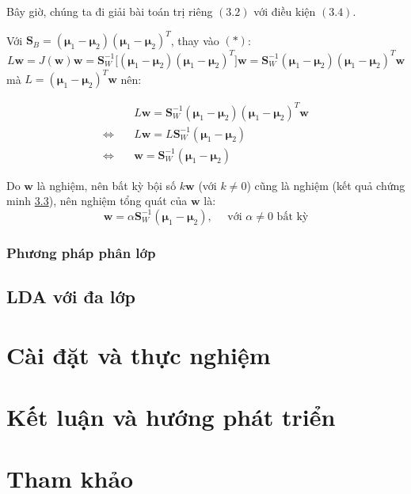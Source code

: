 \documentclass[
  a4paper,
]{article}
\begin{document}
Bây giờ, chúng ta đi giải bài toán trị riêng \((3.2)\) với điều kiện
\((3.4)\).

Với
\(\mathbf{S}_B = (\boldsymbol{\mu}_1 - \boldsymbol{\mu}_2)(\boldsymbol{\mu}_1 - \boldsymbol{\mu}_2)^T\),
thay vào \((*)\):
\[L\mathbf{w}= J(\mathbf{w} ) \mathbf{w} =\mathbf{S}_W^{-1} \bigl[(\boldsymbol{\mu}_1 - \boldsymbol{\mu}_2)(\boldsymbol{\mu}_1 - \boldsymbol{\mu}_2)^T \bigr] \mathbf{w}  = \mathbf{S}_W^{-1} (\boldsymbol{\mu}_1 - \boldsymbol{\mu}_2)(\boldsymbol{\mu}_1 - \boldsymbol{\mu}_2)^T \mathbf{w}\]
mà \(L =(\boldsymbol{\mu}_1 - \boldsymbol{\mu}_2)^T \mathbf{w}\) nên:

\[
\begin{aligned}
&L \mathbf{w} = \mathbf{S}_W^{-1} (\boldsymbol{\mu}_1 - \boldsymbol{\mu}_2)(\boldsymbol{\mu}_1 - \boldsymbol{\mu}_2)^T \mathbf{w} \\
\Leftrightarrow \quad & L \mathbf{w} = L \mathbf{S}_W^{-1} (\boldsymbol{\mu}_1 - \boldsymbol{\mu}_2) \\
\Leftrightarrow \quad & \mathbf{w} = \mathbf{S}_W^{-1} (\boldsymbol{\mu}_1 - \boldsymbol{\mu}_2)
\end{aligned}
\]

Do \(\mathbf{w}\) là nghiệm, nên bất kỳ bội số \(k \mathbf{w}\) (với
\(k \neq 0\)) cũng là nghiệm (kết quả chứng minh \href{}{3.3}), nên
nghiệm tổng quát của \(\mathbf{w}\) là:
\[\mathbf{w} = \alpha\mathbf{S}_W^{-1} (\boldsymbol{\mu}_1 - \boldsymbol{\mu}_2), \quad \text{ với } \alpha \not = 0 \text{ bất kỳ}\]

\pagebreak

\subsubsection{Phương pháp phân
lớp}\label{phux1b0ux1a1ng-phuxe1p-phuxe2n-lux1edbp}

\pagebreak

\subsection{LDA với đa lớp}\label{lda-vux1edbi-ux111a-lux1edbp}

\section{Cài đặt và thực
nghiệm}\label{cuxe0i-ux111ux1eb7t-vuxe0-thux1ef1c-nghiux1ec7m}

\section{Kết luận và hướng phát
triển}\label{kux1ebft-luux1eadn-vuxe0-hux1b0ux1edbng-phuxe1t-triux1ec3n}

\section{Tham khảo}\label{tham-khux1ea3o}
\end{document}
